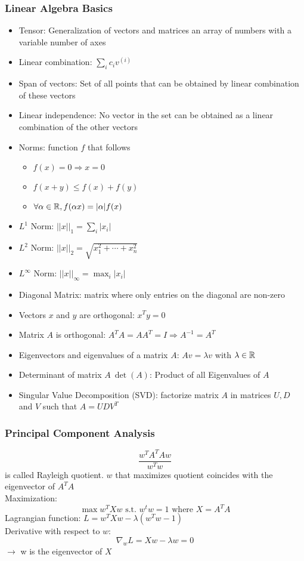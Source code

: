 \subsubsection{Linear Algebra Basics}%
\label{ml:ssub:linear_algebra_basics}
\begin{itemize}
\item Tensor: Generalization of vectors and matrices an array of numbers with a variable number of axes
\item Linear combination: \(\sum_i c_i v^{(i)}\)
\item Span of vectors: Set of all points that can be obtained by linear combination of these vectors
\item Linear independence: No vector in the set can be obtained as a linear combination of the other vectors
\item Norms: function \(f\) that follows
  \begin{itemize}
  \item \(f(x) = 0 \Rightarrow x = 0\)
  \item \(f(x+y) \leq f(x) + f(y)\)
  \item \(\forall \alpha \in \mathbb{R}, f(\alpha x) = |\alpha|f(x)\)
  \end{itemize}
\item \(L^1 \) Norm: \(||x||_1 = \sum_i |x_i|\)
\item \(L^2\) Norm: \(||x||_2 = \sqrt{x_1^2 + \cdots + x_n^2}\)
\item \(L^\infty\) Norm: \(||x||_\infty = \max_i |x_i|\)
\item Diagonal Matrix: matrix where only entries on the diagonal are non-zero
\item Vectors \(x\) and \(y\) are orthogonal: \(x^T y = 0\)
\item Matrix \(A\) is orthogonal: \(A^T A = A A^T = I \Rightarrow A^{-1} = A^T\)
\item Eigenvectors and eigenvalues of a matrix \(A\): \(Av = \lambda v\) with \(\lambda \in \mathbb{R}\)
\item Determinant of matrix \(A\ \det(A)\): Product of all Eigenvalues of \(A\)
\item Singular Value Decomposition (SVD): factorize matrix \(A\) in matrices \(U, D\) and \(V\) such that \(A = UDV^T\)
\end{itemize}

\subsubsection{Principal Component Analysis}%
\label{ml:ssub:principal_component_analysis}
\[\frac{w^T A^T A w}{w^T w}\] is called Rayleigh quotient.
\(w\) that maximizes quotient coincides with the eigenvector of \(A^T A\)\\
Maximization:
\[\max w^T X w \text{ s.t. } w^t w = 1 \text{ where } X = A^T A\]
Lagrangian function: \(L = w^T X w - \lambda (w^T w - 1)\)\\
Derivative with respect to \(w\): \[\nabla_w L = Xw - \lambda w = 0\]
\(\rightarrow\) w is the eigenvector of \(X\)

